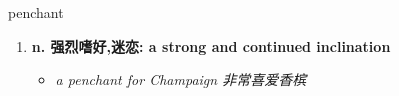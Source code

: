 
\begin{frame}
{\huge penchant}
\begin{center}
\begin{enumerate}\Large
  \item \textbf{n. 强烈嗜好,迷恋: a strong and continued inclination}
  \begin{itemize}
    \item \em{\Large{a penchant for Champaign 非常喜爱香槟}}
  \end{itemize}
\end{enumerate}
\end{center}
\end{frame}
